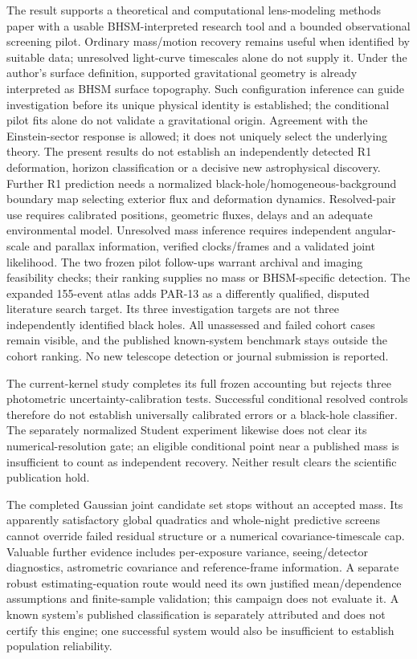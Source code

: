 \documentclass[11pt,a4paper]{article}
\begin{document}
The result supports a theoretical and computational lens-modeling methods
paper with a usable BHSM-interpreted research tool and a bounded
observational screening pilot. Ordinary mass/motion recovery remains
useful when identified by suitable data; unresolved light-curve
timescales alone do not supply it. Under the author's surface definition,
supported gravitational geometry is already interpreted as BHSM surface
topography. Such configuration inference can guide investigation before
its unique physical identity is established; the conditional pilot fits
alone do not validate a gravitational origin. Agreement with the Einstein-sector
response is allowed; it does not uniquely select the underlying theory. The present results do not establish
an independently detected R1 deformation, horizon classification or a decisive new
astrophysical discovery. Further R1 prediction needs a normalized
black-hole/homogeneous-background boundary map selecting exterior flux
and deformation dynamics. Resolved-pair use requires calibrated
positions, geometric fluxes, delays and an adequate environmental model.
Unresolved mass inference requires independent angular-scale and
parallax information, verified clocks/frames and a validated joint
likelihood. The two frozen pilot follow-ups warrant archival and imaging
feasibility checks; their ranking supplies no mass or BHSM-specific
detection. The expanded 155-event atlas adds PAR-13 as a differently
qualified, disputed literature search target. Its three investigation
targets are not three independently identified black holes. All
unassessed and failed cohort cases remain visible, and the published
known-system benchmark stays outside the cohort ranking. No new
telescope detection or journal submission is reported.

The current-kernel study completes its full frozen accounting but rejects three
photometric uncertainty-calibration tests. Successful conditional resolved
controls therefore do not establish universally calibrated errors or a
black-hole classifier. The separately normalized Student experiment likewise
does not clear its numerical-resolution gate; an eligible conditional point
near a published mass is insufficient to count as independent recovery.
Neither result clears the scientific publication hold.

The completed Gaussian joint candidate set stops without an accepted mass. Its apparently
satisfactory global quadratics and whole-night predictive screens cannot override
failed residual structure or a numerical covariance-timescale cap. Valuable
further evidence includes per-exposure variance, seeing/detector diagnostics,
astrometric covariance and reference-frame information. A separate robust
estimating-equation route would need its own justified mean/dependence assumptions
and finite-sample validation; this campaign does not evaluate it. A known system's published classification
is separately attributed and does not certify this engine; one successful system
would also be insufficient to establish population reliability.
\end{document}
